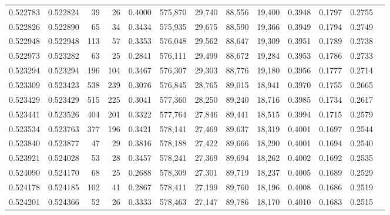 \begin{tabular}{rrrrrrrrrrrrr}
0.522783 & 0.522824 &    39 &    26 &                                     0.4000 & 575,870 &  29,740 &  88,556 &  19,400 & 0.3948 & 0.1797 & 0.2755 \\
0.522826 & 0.522890 &    65 &    34 &                                     0.3434 & 575,935 &  29,675 &  88,590 &  19,366 & 0.3949 & 0.1794 & 0.2749 \\
0.522948 & 0.522948 &   113 &    57 &                                     0.3353 & 576,048 &  29,562 &  88,647 &  19,309 & 0.3951 & 0.1789 & 0.2738 \\
0.522973 & 0.523282 &    63 &    25 &                                     0.2841 & 576,111 &  29,499 &  88,672 &  19,284 & 0.3953 & 0.1786 & 0.2733 \\
0.523294 & 0.523294 &   196 &   104 &                                     0.3467 & 576,307 &  29,303 &  88,776 &  19,180 & 0.3956 & 0.1777 & 0.2714 \\
0.523309 & 0.523423 &   538 &   239 &                                     0.3076 & 576,845 &  28,765 &  89,015 &  18,941 & 0.3970 & 0.1755 & 0.2665 \\
0.523429 & 0.523429 &   515 &   225 &                                     0.3041 & 577,360 &  28,250 &  89,240 &  18,716 & 0.3985 & 0.1734 & 0.2617 \\
0.523441 & 0.523526 &   404 &   201 &                                     0.3322 & 577,764 &  27,846 &  89,441 &  18,515 & 0.3994 & 0.1715 & 0.2579 \\
0.523534 & 0.523763 &   377 &   196 &                                     0.3421 & 578,141 &  27,469 &  89,637 &  18,319 & 0.4001 & 0.1697 & 0.2544 \\
0.523840 & 0.523877 &    47 &    29 &                                     0.3816 & 578,188 &  27,422 &  89,666 &  18,290 & 0.4001 & 0.1694 & 0.2540 \\
0.523921 & 0.524028 &    53 &    28 &                                     0.3457 & 578,241 &  27,369 &  89,694 &  18,262 & 0.4002 & 0.1692 & 0.2535 \\
0.524090 & 0.524170 &    68 &    25 &                                     0.2688 & 578,309 &  27,301 &  89,719 &  18,237 & 0.4005 & 0.1689 & 0.2529 \\
0.524178 & 0.524185 &   102 &    41 &                                     0.2867 & 578,411 &  27,199 &  89,760 &  18,196 & 0.4008 & 0.1686 & 0.2519 \\
0.524201 & 0.524366 &    52 &    26 &                                     0.3333 & 578,463 &  27,147 &  89,786 &  18,170 & 0.4010 & 0.1683 & 0.2515 \\

\end{tabular}
